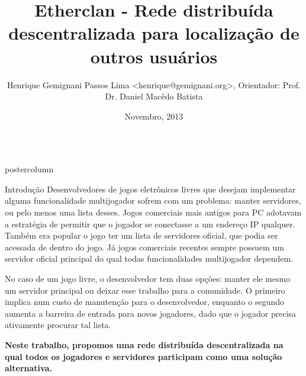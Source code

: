 \documentclass[final]{beamer}
\title{\huge Etherclan - Rede distribuída descentralizada para localização de outros usuários}
\author{Henrique Gemignani Passos Lima <henrique@gemignani.org>, Orientador: Prof. Dr. Daniel Macêdo Batista}
\institute[Universidade de São Paulo] %
{
  Instituto de Matemática e Estatística, Universidade de São Paulo - Trabalho
  de Conclusão de Curso
}
\date[Novembro 2013]{Novembro, 2013}
\newlength{\columnheight}
\begin{document}
\begin{frame}
  \begin{columns}
    \begin{column}{.5\textwidth}
      \begin{beamercolorbox}[center,wd=\textwidth]{postercolumn}
        \begin{minipage}[T]{.95\textwidth} %
          \parbox[t][\columnheight]{\textwidth}{ %
            
            \vspace*{0.8cm}
            
            \begin{block}{Introdução}
            \justifying
                Desenvolvedores de jogos eletrônicos livres que desejam implementar alguma
                funcionalidade multijogador sofrem com um problema: manter servidores, ou pelo
                menos uma lista desses. Jogos comerciais mais antigos para PC adotavam a
                estratégia de permitir que o jogador se conectasse a um endereço IP qualquer.
                Também era popular o jogo ter um lista de servidores oficial, que podia ser
                acessada de dentro do jogo. Já jogos comerciais recentes sempre possuem um
                servidor oficial principal do qual todas funcionalidades multijogador dependem.
                
                \vspace*{0.15cm}
                
                No caso de um jogo livre, o desenvolvedor tem duas opções: manter ele mesmo um
                servidor principal ou deixar esse trabalho para a comunidade. O primeiro implica
                num custo de manutenção para o desenvolvedor, enquanto o segundo aumenta a
                barreira de entrada para novos jogadores, dado que o jogador precisa ativamente
                procurar tal lista.
                
                \vspace*{0.15cm}

                \textbf{Neste trabalho, propomos uma rede distribuída descentralizada na qual
                todos os jogadores e servidores participam como uma solução alternativa.}
                

\end{block}}
\end{minipage}
\end{beamercolorbox}
\end{column}
\end{columns}
\end{frame}
\end{document}
